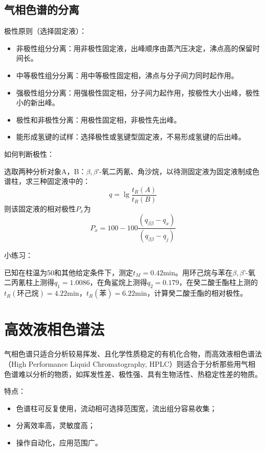 \subsection{气相色谱的分离}
极性原则（选择固定液）：
\begin{itemize}
	\item 非极性组分分离：用非极性固定液，出峰顺序由蒸汽压决定，沸点高的保留时间长。
	\item 中等极性组分分离：用中等极性固定相，沸点与分子间力同时起作用。
	\item 强极性组分分离：用强极性固定相，分子间力起作用，按极性大小出峰，极性小的新出峰。
	\item 极性和非极性分离：用极性固定相，非极性先出峰。
	\item 能形成氢键的试样：选择极性或氢键型固定液，不易形成氢键的后出峰。
\end{itemize}

如何判断极性：

\begin{example}
选取两种分析对象A，B：$\beta,\beta’$-氧二丙氰、角沙烷，以待测固定液为固定液制成色谱柱，求三种固定液中的：
\begin{equation*}
	q=\lg⁡\dfrac{t_R (A)}{t_R (B)}
\end{equation*}
则该固定液的相对极性$P_x$为
\begin{equation*}
	P_x=100-100 \dfrac{(q_{\beta\beta}-q_x)}{(q_{\beta\beta}-q_j)}
\end{equation*}
\end{example}

小练习：
\begin{example}
	已知在柱温为50\textcelsius 和其他给定条件下，测定$t_M=0.42$min。用环己烷与苯在$\beta,\beta’$-氧二丙氰柱上测得$q_1=1.0086$，在角鲨烷上测得$q_2=0.179$，在癸二酸壬酯柱上测的$t_R(\text{环己烷})=4.22$min，$t_R(\text{苯})=6.22$min，计算癸二酸壬酯的相对极性。
\end{example}

\section{高效液相色谱法}

气相色谱只适合分析较易挥发、且化学性质稳定的有机化合物，而高效液相色谱法（High Performance Liquid Chromatography, HPLC）则适合于分析那些用气相色谱难以分析的物质，如挥发性差、极性强、具有生物活性、热稳定性差的物质。

特点：
\begin{itemize}
	\item 色谱柱可反复使用，流动相可选择范围宽，流出组分容易收集；
	\item 分离效率高，灵敏度高；
	\item 操作自动化，应用范围广。
\end{itemize}

